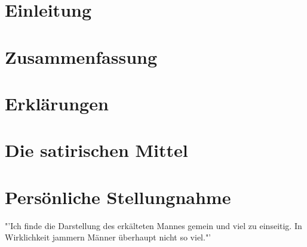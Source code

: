 \documentclass[12pt,a4paper]{scrartcl}
\begin{document}
\begin{spacing}{2}

\section{Einleitung}

\section{Zusammenfassung}


\section{Erklärungen}

\section{Die satirischen Mittel}


\section{Persönliche Stellungnahme}
"'Ich finde die Darstellung des erkälteten Mannes gemein und viel zu einseitig. In Wirklichkeit jammern Männer überhaupt nicht so viel."'\\

\end{spacing}
\end{document}
